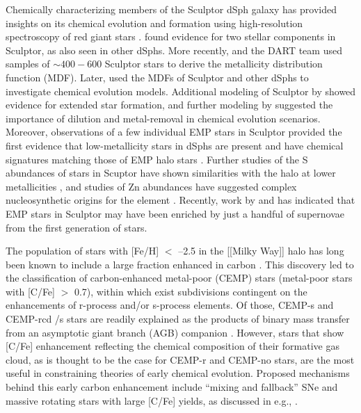 \documentclass{emulateapj-rtx4}
\begin{document}
Chemically characterizing members of the Sculptor dSph galaxy has provided
insights on its chemical evolution and formation using 
high-resolution spectroscopy of red giant stars \citep{svt+03, tvs+03, gsw+05}. \citet{tih+04} found 
evidence for two stellar components in Sculptor, as also seen in other dSphs.
More recently, \citet{kgb+09} and the DART team \citep{bht+08, sht+10, rs+13} used samples of $\sim400-600$ Sculptor stars to derive the metallicity distribution function (MDF). 
Later, \citet{kcm+11} used the MDFs of Sculptor and other dSphs to investigate chemical 
evolution models.
Additional modeling of Sculptor by \citet{dts+12} showed evidence for extended star formation, and further modeling by \citet{rs+13} suggested the importance of dilution and metal-removal in chemical evolution scenarios.
Moreover, observations of a few individual EMP stars in Sculptor provided
the first evidence that low-metallicity stars
in dSphs are present and have chemical signatures matching those of EMP halo stars \citep{fks+10,tjh+10}.
Further studies of the S abundances of stars in Scuptor have shown similarities with the halo at lower metallicities \citep{sat+15}, and studies of Zn abundances have suggested complex nucleosynthetic origins for the element \citep{sts+17}.
Recently, work by \citet{sjf+15} and \citet{jnm+15} has indicated that EMP stars in Sculptor 
may have been enriched by just a handful of supernovae from the first generation of stars. 

The population of stars with [Fe/H] $<$ --2.5 in the [[Milky Way]] halo has long been 
known to include a large fraction enhanced in carbon \citep{bps+92, rbs+99, anr+02, ryan+03, bc+05, cst+05,
abc+07, pfb+14, fn+15}. 
This discovery led to the classification of 
carbon-enhanced metal-poor (CEMP) stars (metal-poor stars with [C/Fe] $>$ 0.7), within
which exist subdivisions contingent on the enhancements of r-process and/or s-process elements. 
Of those, CEMP-s and CEMP-rcd /s stars are readily explained as the products of binary mass
transfer from an asymptotic giant branch (AGB) companion \citep{ltb+05,han+16b}. However, stars that show [C/Fe] 
enhancement reflecting the chemical composition of their formative gas cloud,
as is thought to be the case for CEMP-r and CEMP-no stars, are the most 
useful in constraining theories of early chemical evolution.
Proposed mechanisms behind this early carbon enhancement include ``mixing and fallback''
SNe and massive rotating stars with large [C/Fe] yields, as discussed in e.g.,  \citet{nyb+13}.
\end{document}
